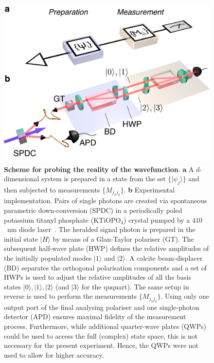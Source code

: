 \documentclass[aps,prl,floatfix,onecolumn,tightenlines,amsmath,amssymb,nofootinbib,12pt]{revtex4-2}
\newcommand{\ket}[1] {| #1 \rangle}
\begin{document}
\begin{figure}[h!]
\begin{center}
\includegraphics[width=\columnwidth]{Figure_2.pdf}
\end{center}
\vspace{-1.5em}
\caption{\textbf{Scheme for probing the reality of the wavefunction}. \textbf{a} A $d$-dimensional system is prepared in a state from the set $\{\ket{\psi_{j}}\}$ and then subjected to measurements $\{M_{j_1j_2}\}$.
\textbf{b} Experimental implementation. Pairs of single photons are created via spontaneous parametric down-conversion (SPDC) in a periodically poled potassium titanyl phosphate (KTiOPO$_4$) crystal pumped by a $410$~nm diode laser~\cite{Fedrizzi2007a}. The heralded signal photon is prepared in the initial state $\ket{H}$ by means of a Glan-Taylor polariser (GT). The subsequent half-wave plate (HWP) defines the relative amplitudes of the initially populated modes $\ket{1}$ and $\ket{2}$. A calcite beam-displacer (BD) separates the orthogonal polarisation components and a set of HWPs is used to adjust the relative amplitudes of all the basis states $\ket{0}, \ket{1}, \ket{2}$ (and $\ket 3$ for the ququart). The same setup in reverse is used to perform the measurements $\{M_{j_1j_2}\}$. Using only one output port of the final analysing polariser and one single-photon detector (APD) ensures maximal fidelity of the measurement process. Furthermore, while additional quarter-wave plates (QWPs) could be used to access the full (complex) state space, this is not necessary for the present experiment. Hence, the QWPs were not used to allow for higher accuracy.}
  \label{fig:Setup}
\end{figure}
\end{document}
